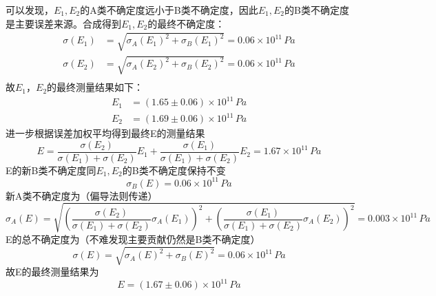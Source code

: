 \documentclass[12pt]{article}
\begin{document}
可以发现，$E_1,E_2$的A类不确定度远小于B类不确定度，因此$E_1,E_2$的B类不确定度是主要误差来源。合成得到$E_1,E_2$的最终不确定度：
\[
\begin{aligned}
    \sigma(E_1)&=\sqrt{\sigma_A(E_1)^2+\sigma_B(E_1)^2}=0.06\times 10^{11}\,Pa\\
    \sigma(E_2)&=\sqrt{\sigma_A(E_2)^2+\sigma_B(E_2)^2}=0.06\times 10^{11}\,Pa\\
\end{aligned}
\]
故$E_1$，$E_2$的最终测量结果如下：
\begin{equation}
\begin{aligned}
    E_1&=(1.65\pm 0.06)\times 10^{11}\,Pa\\
    E_2&=(1.69\pm 0.06)\times 10^{11}\,Pa
\end{aligned}
\end{equation}
进一步根据误差加权平均得到最终E的测量结果
\[
    E=\frac{\sigma(E_2)}{\sigma(E_1)+\sigma(E_2)}E_1+\frac{\sigma(E_1)}{\sigma(E_1)+\sigma(E_2)}E_2=1.67\times 10^{11}\,Pa
\]
E的新B类不确定度同$E_1,E_2$的B类不确定度保持不变
\[
    \sigma_B(E)=0.06\times 10^{11}\,Pa
\]
新A类不确定度为（偏导法则传递）
\[
    \sigma_A(E)=\sqrt{(\frac{\sigma(E_2)}{\sigma(E_1)+\sigma(E_2)}\sigma_A(E_1))^2+(\frac{\sigma(E_1)}{\sigma(E_1)+\sigma(E_2)}\sigma_A(E_2))^2}=0.003\times 10^{11}\,Pa
\]
E的总不确定度为（不难发现主要贡献仍然是B类不确定度）
\[
    \sigma(E)=\sqrt{\sigma_A(E)^2+\sigma_B(E)^2}=0.06\times 10^{11}\,Pa
\]
故E的最终测量结果为
\begin{equation}
    E=(1.67\pm 0.06)\times 10^{11}\,Pa
\end{equation}
\end{document}
